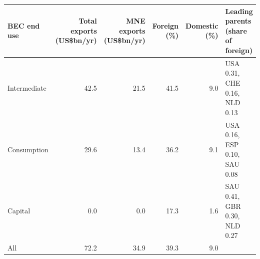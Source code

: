 \begin{tabular}{@{}l r r r r l@{}}
\toprule
BEC end use & Total exports (US\$bn/yr) & MNE exports (US\$bn/yr) & Foreign (\%) & Domestic (\%) & Leading parents (share of foreign) \\
\midrule
Intermediate & 42.5 & 21.5 & 41.5 & 9.0 & USA 0.31, CHE 0.16, NLD 0.13 \\
Consumption & 29.6 & 13.4 & 36.2 & 9.1 & USA 0.16, ESP 0.10, SAU 0.08 \\
Capital & 0.0 & 0.0 & 17.3 & 1.6 & SAU 0.41, GBR 0.30, NLD 0.27 \\
\midrule
All & 72.2 & 34.9 & 39.3 & 9.0 & \\
\bottomrule
\end{tabular}

